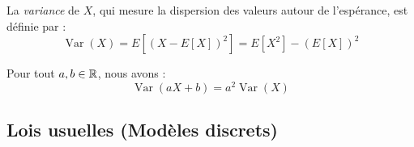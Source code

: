 \begin{definition}[Variance]
    La \emph{variance} de $X$, qui mesure la dispersion des valeurs autour de l'espérance, est définie par :
    \[
    \operatorname{Var}(X) = E\left[(X - E[X])^2\right] = E[X^2] - (E[X])^2
    \]
\end{definition}

\begin{proposition}
    Pour tout $a, b \in \mathbb{R}$, nous avons :
    \[
    \operatorname{Var}(aX + b) = a^2 \operatorname{Var}(X)
    \]
\end{proposition}

\subsection{Lois usuelles (Modèles discrets)}

